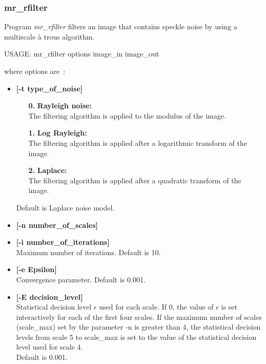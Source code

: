 \begin{itemize}
\subsubsection{mr\_rfilter}
Program {\em mr\_rfilter} filters an image that contains speckle noise 
by using a multiscale \`a trous algorithm.
{\bf 
\begin{center}
 USAGE: mr\_rfilter options image\_in image\_out
\end{center}}
where options are~:
\begin{itemize}
\baselineskip=0.4truecm
\itemsep=0.1truecm
\item {\bf [-t type\_of\_noise]} 
\begin{itemize}
\baselineskip=0.4truecm
\item [{\bf 0.} ] {\bf Rayleigh noise:}\\
The filtering algorithm is applied to the modulus of the image. 

\item [{\bf 1.} ] {\bf Log Rayleigh:}\\
The  filtering algorithm is applied after a logarithmic transform of the image.

\item [{\bf 2.} ] {\bf  Laplace:}\\
The filtering algorithm is applied after a quadratic transform of the image.

\end{itemize}

Default is Laplace noise model.

\item {\bf [-n number\_of\_scales]} 

\item {\bf [-i number\_of\_iterations]} \\
Maximum number of iterations. Default is 10. 

\item {\bf [-e Epsilon]} \\
Convergence parameter. Default is 0.001.

\item {\bf [-E decision\_level]} \\
Statistical decision level $\epsilon$ used for each scale. If 0, the 
value of $\epsilon$  is set interactively for each of the first four 
scales. If the maximum number of scales (scale\_max) set by the 
parameter -n is greater than 4, the  statistical decision levels 
from scale 5 to scale\_max is set to the value of the  
statistical decision level used for scale 4.\\ 
Default is 0.001.



\end{itemize}
\end{itemize}
